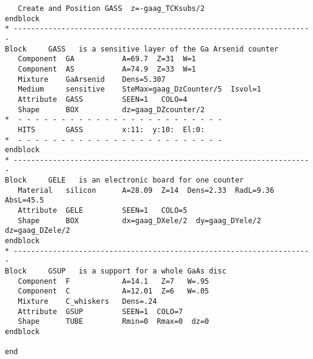 \begin{verbatim}
   Create and Position GASS  z=-gaag_TCKsubs/2
endblock
* ---------------------------------------------------------------------
Block     GASS   is a sensitive layer of the Ga Arsenid counter
   Component  GA           A=69.7  Z=31  W=1
   Component  AS           A=74.9  Z=33  W=1
   Mixture    GaArsenid    Dens=5.307
   Medium     sensitive    SteMax=gaag_DzCounter/5  Isvol=1
   Attribute  GASS         SEEN=1   COLO=4
   Shape      BOX          dz=gaag_DZcounter/2
*  - - - - - - - - - - - - - - - - - - - - - - - - 
   HITS       GASS         x:11:  y:10:  El:0:
*  - - - - - - - - - - - - - - - - - - - - - - - - 
endblock
* ---------------------------------------------------------------------
Block     GELE   is an electronic board for one counter
   Material   silicon      A=28.09  Z=14  Dens=2.33  RadL=9.36  AbsL=45.5
   Attribute  GELE         SEEN=1   COLO=5
   Shape      BOX          dx=gaag_DXele/2  dy=gaag_DYele/2  dz=gaag_DZele/2
endblock
* ---------------------------------------------------------------------
Block     GSUP   is a support for a whole GaAs disc
   Component  F            A=14.1   Z=7   W=.95
   Component  C            A=12.01  Z=6   W=.05
   Mixture    C_whiskers   Dens=.24
   Attribute  GSUP         SEEN=1  COLO=7
   Shape      TUBE         Rmin=0  Rmax=0  dz=0
endblock

end
\end{verbatim}


\newpage 
